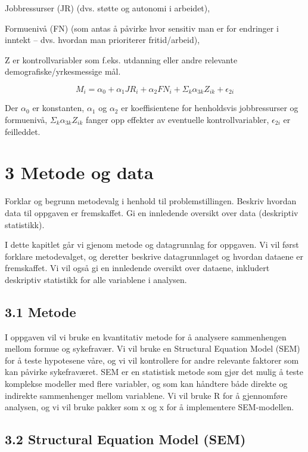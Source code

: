 \documentclass[
  12pt,
  a4paper,
  DIV=11,
  numbers=noendperiod]{scrartcl}
\begin{document}
Jobbressurser (JR) (dvs. støtte og autonomi i arbeidet),

Formuenivå (FN) (som antas å påvirke hvor sensitiv man er for endringer
i inntekt -- dvs. hvordan man prioriterer fritid/arbeid),

Z er kontrollvariabler som f.eks. utdanning eller andre relevante
demografiske/yrkesmessige mål.

\[
M_i = \alpha_0 + \alpha_1 JR_i + \alpha_2 FN_i + \Sigma_k \alpha_{3k}Z_{ik} + \epsilon_{2i}
\]

Der \(\alpha_0\) er konstanten, \(\alpha_1\) og \(\alpha_2\) er
koeffisientene for henholdsvis jobbressurser og formuenivå,
\(\Sigma_k \alpha_{3k}Z_{ik}\) fanger opp effekter av eventuelle
kontrollvariabler, \(\epsilon_{2i}\) er feilleddet.

\newpage

\section{3 Metode og data}\label{metode-og-data}

Forklar og begrunn metodevalg i henhold til problemstillingen. Beskriv
hvordan data til oppgaven er fremskaffet. Gi en innledende oversikt over
data (deskriptiv statistikk).

I dette kapitlet går vi gjenom metode og datagrunnlag for oppgaven. Vi
vil først forklare metodevalget, og deretter beskrive datagrunnlaget og
hvordan dataene er fremskaffet. Vi vil også gi en innledende oversikt
over dataene, inkludert deskriptiv statistikk for alle variablene i
analysen.

\subsection{3.1 Metode}\label{metode}

I oppgaven vil vi bruke en kvantitativ metode for å analysere
sammenhengen mellom formue og sykefravær. Vi vil bruke en Structural
Equation Model (SEM) for å teste hypotesene våre, og vi vil kontrollere
for andre relevante faktorer som kan påvirke sykefraværet. SEM er en
statistisk metode som gjør det mulig å teste komplekse modeller med
flere variabler, og som kan håndtere både direkte og indirekte
sammenhenger mellom variablene. Vi vil bruke R for å gjennomføre
analysen, og vi vil bruke pakker som x og x for å implementere
SEM-modellen.

\subsection{3.2 Structural Equation Model
(SEM)}\label{structural-equation-model-sem}
\end{document}
